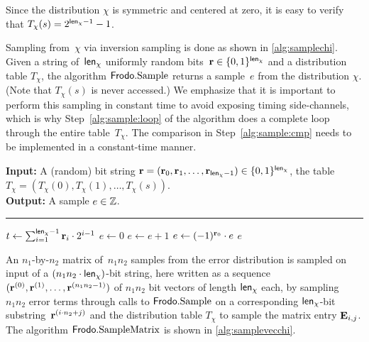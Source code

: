 Since the distribution $\chi$ is symmetric and centered at zero, it is easy to verify that
$T_{\chi}(s) = 2^{{\mathsf{len}_{\chi}}-1}-1$.

Sampling from~$\chi$ via inversion sampling is done as shown in
\autoref{alg:samplechi}.  Given a string of~${\mathsf{len}_{\chi}}$ uniformly
random bits~$\mathbf{r} \in \{0,1\}^{{\mathsf{len}_{\chi}}}$ and a distribution table
$T_{\chi}$, the algorithm $\Frodo.\Samp$ returns a sample~$e$ from the
distribution $\chi$. (Note that $T_\chi(s)$ is never accessed.)
We emphasize that it is important to perform
this sampling in constant time to avoid exposing timing side-channels,
which is why Step~\ref{alg:sample:loop} of the algorithm does a complete loop through the
entire table~$T_{\chi}$. The comparison in Step~\ref{alg:sample:cmp} needs
to be implemented in a constant-time manner.

\begin{algorithm}[H]
\caption{\label{alg:samplechi} $\Frodo.\Samp$}
{\bf Input:} A (random) bit string $\mathbf{r} = (\mathbf{r}_0, \mathbf{r}_1, \dots,
\mathbf{r}_{{\mathsf{len}_{\chi}}-1}) \in \{0,1\}^{{\mathsf{len}_{\chi}}}$, the table $T_{\chi} = (T_{\chi}(0), T_{\chi}(1), \dots, T_{\chi}(s))$.\\
{\bf Output:} A sample $e \in \mathbb{Z}$.\\[-1.5ex]
\rule{\linewidth}{.5pt}
\vspace{-0.5cm}
\begin{algorithmic}[1]
    \STATE $t \gets \sum_{i=1}^{{\mathsf{len}_{\chi}}-1} \mathbf{r}_i\cdot 2^{i-1}$
    \STATE $e\gets 0$
    \label{alg:sample:loop}
    \label{alg:sample:cmp}
    \STATE $e\gets e+1$
    \ENDIF
    \ENDFOR
    \STATE $e\gets (-1)^{\mathbf{r}_0}\cdot e$
    \RETURN$e$
\end{algorithmic}
\end{algorithm}

An $n_1$-by-$n_2$ matrix of~$n_1n_2$ samples from the error
distribution is sampled on input of a 
$(n_1n_2 \cdot {\mathsf{len}_{\chi}})$-bit string, here written as a sequence 
$(\mathbf{r}^{(0)}, \mathbf{r}^{(1)}, \dots, \mathbf{r}^{(n_1n_2-1)})$ of
$n_1n_2$ bit vectors of length
${\mathsf{len}_{\chi}}$ each,
by sampling~$n_1n_2$ error terms through calls to $\Frodo.\Samp$ on a
corresponding ${\mathsf{len}_{\chi}}$-bit substring~$\mathbf{r}^{(i\cdot n_2 + j)}$ and
the distribution table $T_\chi$ to sample the matrix entry
$\mathbf{E}_{i,j}$. The algorithm $\textsf{\upshape\mdseries Frodo}.\textrm{\upshape\mdseries SampleMatrix}$ is shown in
\autoref{alg:samplevecchi}.

